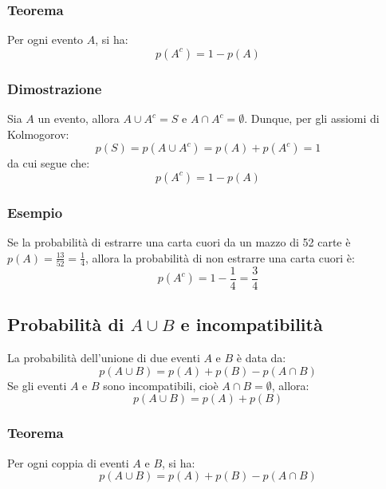 \documentclass{article}
\begin{document}
\subsubsection{Teorema}
Per ogni evento \(A\), si ha:
\[
p(A^c) = 1 - p(A)
\]

\subsubsection{Dimostrazione}
Sia \(A\) un evento, allora \(A \cup A^c = S\) e \(A \cap A^c = \emptyset\). Dunque, per gli assiomi di Kolmogorov:
\[
p(S) = p(A \cup A^c) = p(A) + p(A^c) = 1
\]
da cui segue che:
\[
p(A^c) = 1 - p(A)
\]

\subsubsection{Esempio}
Se la probabilità di estrarre una carta cuori da un mazzo di 52 carte è \(p(A) = \frac{13}{52} = \frac{1}{4}\), allora la probabilità di non estrarre una carta cuori è:
\[
p(A^c) = 1 - \frac{1}{4} = \frac{3}{4}
\]


\newpage
\subsection{Probabilità di \(A \cup B\) e incompatibilità}
La probabilità dell'unione di due eventi \(A\) e \(B\) è data da:
\[
p(A \cup B) = p(A) + p(B) - p(A \cap B)
\]
Se gli eventi \(A\) e \(B\) sono incompatibili, cioè \(A \cap B = \emptyset\), allora:
\[
p(A \cup B) = p(A) + p(B)
\]

\subsubsection{Teorema}
Per ogni coppia di eventi \(A\) e \(B\), si ha:
\[
p(A \cup B) = p(A) + p(B) - p(A \cap B)
\]
\end{document}
